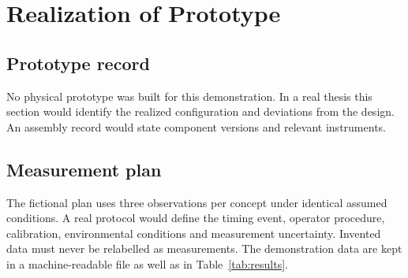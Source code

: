 \chapter{Realization of Prototype}
\label{chap:realization_of_prototype}

\section{Prototype record}
\label{sec:prototype}
No physical prototype was built for this demonstration. In a real thesis this
section would identify the realized configuration and deviations from the design.
An assembly record would state component versions and relevant instruments.

\section{Measurement plan}
The fictional plan uses three observations per concept under identical assumed
conditions. A real protocol would define the timing event, operator procedure,
calibration, environmental conditions and measurement uncertainty. Invented data
must never be relabelled as measurements. The demonstration data are kept in a
machine-readable file as well as in Table~\ref{tab:results}.
